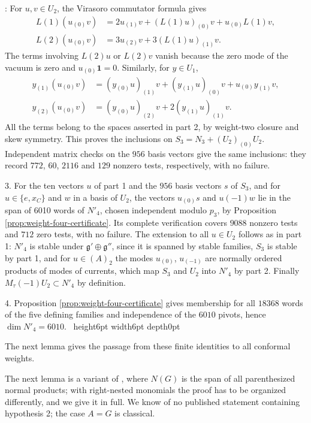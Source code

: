 \documentclass[leqno]{article}
\newcommand{\qed}{\hfill \vrule height6pt  width6pt depth0pt}
\newenvironment{proof}[1][]{\noindent {\it Proof #1} : }{\hbox{~}\qed
\smallskip
}
\numberwithin{equation}{section}
\begin{document}
\begin{proof}
For $u,v \in U_2$, the Virasoro commutator formula gives
\[
\begin{aligned}
L(1)(u_{(0)}v) &= 2u_{(1)}v+(L(1)u)_{(0)}v+u_{(0)}L(1)v,\\
L(2)(u_{(0)}v) &= 3u_{(2)}v+3(L(1)u)_{(1)}v.
\end{aligned}
\]
The terms involving $L(2)u$ or $L(2)v$ vanish because the zero mode of the vacuum is zero and $u_{(0)}\mathbf 1 = 0$. Similarly, for $y \in U_1$,
\[
\begin{aligned}
y_{(1)}(u_{(0)}v) &= (y_{(0)}u)_{(1)}v+(y_{(1)}u)_{(0)}v+u_{(0)}y_{(1)}v,\\
y_{(2)}(u_{(0)}v) &= (y_{(0)}u)_{(2)}v+2(y_{(1)}u)_{(1)}v.
\end{aligned}
\]
All the terms belong to the spaces asserted in part 2, by weight-two closure and skew symmetry. This proves the inclusions on $S_3 = N_3+(U_2)_{(0)}U_2$. Independent matrix checks on the $956$ basis vectors give the same inclusions: they record $772$, $60$, $2116$ and $129$ nonzero tests, respectively, with no failure.

3. For the ten vectors $u$ of part 1 and the $956$ basis vectors $s$ of $S_3$, and for $u \in \{e,x_C\}$ and $w$ in a basis of $U_2$, the vectors $u_{(0)}s$ and $u(-1)w$ lie in the span of 6010 words of $N'_4$, chosen independent modulo $p_3$, by Proposition \ref{prop:weight-four-certificate}. Its complete verification covers $9088$ nonzero tests and $712$ zero tests, with no failure. The extension to all $u \in U_2$ follows as in part 1: $N'_4$ is stable under $\mathfrak g' \oplus \mathfrak g''$, since it is spanned by stable families, $S_3$ is stable by part 1, and for $u \in (A)_2$ the modes $u_{(0)}$, $u_{(-1)}$ are normally ordered products of modes of currents, which map $S_3$ and $U_2$ into $N'_4$ by part 2. Finally $M_\tau(-1)U_2 \subset N'_4$ by definition.

4. Proposition \ref{prop:weight-four-certificate} gives membership for all $18368$ words of the five defining families and independence of the $6010$ pivots, hence $\dim N'_4 = 6010$.
\end{proof}

The next lemma gives the passage from these finite identities to all conformal weights.

The next lemma is a variant of \cite[Lemma 4.3]{Rie26b}, where $N(G)$ is the span of all parenthesized normal products; with right-nested monomials the proof has to be organized differently, and we give it in full. We know of no published statement containing hypothesis 2; the case $A = G$ is classical.
\end{document}
